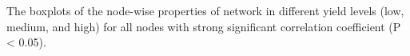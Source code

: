 The boxplots of the node-wise properties of network in different yield levels (low, medium, and high) for all nodes with strong significant correlation coefficient (P < 0.05).